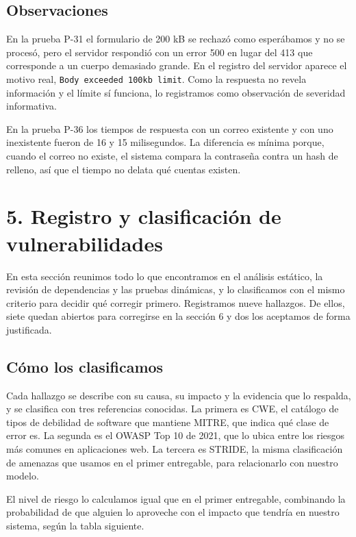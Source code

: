 \documentclass[12pt, letterpaper]{article}
\begin{document}
\subsection{Observaciones}

En la prueba P-31 el formulario de 200 kB se rechazó como esperábamos y no se procesó, pero el servidor respondió con un error 500 en lugar del 413 que corresponde a un cuerpo demasiado grande. En el registro del servidor aparece el motivo real, \texttt{Body exceeded 100kb limit}. Como la respuesta no revela información y el límite sí funciona, lo registramos como observación de severidad informativa.

En la prueba P-36 los tiempos de respuesta con un correo existente y con uno inexistente fueron de 16 y 15 milisegundos. La diferencia es mínima porque, cuando el correo no existe, el sistema compara la contraseña contra un hash de relleno, así que el tiempo no delata qué cuentas existen.

\section{5. Registro y clasificación de vulnerabilidades}

En esta sección reunimos todo lo que encontramos en el análisis estático, la revisión de dependencias y las pruebas dinámicas, y lo clasificamos con el mismo criterio para decidir qué corregir primero. Registramos nueve hallazgos. De ellos, siete quedan abiertos para corregirse en la sección 6 y dos los aceptamos de forma justificada.

\subsection{Cómo los clasificamos}

Cada hallazgo se describe con su causa, su impacto y la evidencia que lo respalda, y se clasifica con tres referencias conocidas. La primera es CWE, el catálogo de tipos de debilidad de software que mantiene MITRE, que indica qué clase de error es. La segunda es el OWASP Top 10 de 2021, que lo ubica entre los riesgos más comunes en aplicaciones web. La tercera es STRIDE, la misma clasificación de amenazas que usamos en el primer entregable, para relacionarlo con nuestro modelo.

El nivel de riesgo lo calculamos igual que en el primer entregable, combinando la probabilidad de que alguien lo aproveche con el impacto que tendría en nuestro sistema, según la tabla siguiente.
\end{document}

